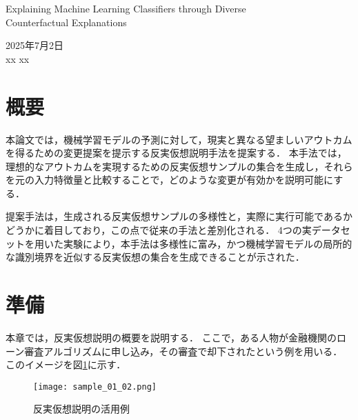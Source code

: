 \documentclass[dvipdfmx]{jreport}
\begin{document}
\begin{center}{
        \Large{Explaining Machine Learning Classifiers through Diverse\\Counterfactual Explanations}
}
\end{center}

\begin{flushright}
    2025年7月2日\\
    xx xx
\end{flushright}


\section{概要}
本論文では，機械学習モデルの予測に対して，現実と異なる望ましいアウトカムを得るための変更提案を提示する反実仮想説明手法を提案する．
本手法では，理想的なアウトカムを実現するための反実仮想サンプルの集合を生成し，それらを元の入力特徴量と比較することで，どのような変更が有効かを説明可能にする．

提案手法は，生成される反実仮想サンプルの多様性と，実際に実行可能であるかどうかに着目しており，この点で従来の手法と差別化される．
4つの実データセットを用いた実験により，本手法は多様性に富み，かつ機械学習モデルの局所的な識別境界を近似する反実仮想の集合を生成できることが示された．

\section{準備}
本章では，反実仮想説明の概要を説明する．
ここで，ある人物が金融機関のローン審査アルゴリズムに申し込み，その審査で却下されたという例を用いる．
このイメージを図\ref{fig:dice}に示す．

\begin{figure}[h]
    \begin{center}
        \texttt{[image: sample\_01\_02.png]} 
        \caption{反実仮想説明の活用例} \label{fig:dice}
    \end{center}
\end{figure}

\end{document}
